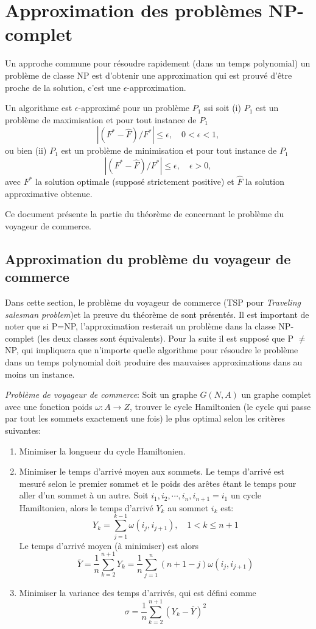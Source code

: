 \documentclass[../main.tex]{subfiles}
\begin{document}
\section{Approximation des problèmes NP-complet}
Un approche commune pour résoudre rapidement (dans un temps polynomial) un problème de classe NP est d'obtenir une approximation qui est prouvé d'être proche de la solution, c'est une $\epsilon$-approximation.

\begin{definition}
Un algorithme est $\epsilon$-approximé pour un problème $P_1$ ssi soit (i) $P_1$ est un problème de maximisation et pour tout instance de $P_1$
\[
|(F^* - \hat{F})/F^*| \leq \epsilon, \quad 0 < \epsilon < 1,
\]
ou bien (ii) $P_1$ est un problème de minimisation et pour tout instance de $P_1$
\[
|(F^* - \hat{F})/F^*| \leq \epsilon, \quad \epsilon > 0,
\]
avec $F^*$ la solution optimale (supposé strictement positive) et $\hat{F}$ la solution approximative obtenue.
\end{definition}

Ce document présente la partie du théorème de \cite{Sahni1976} concernant le problème du voyageur de commerce.

\subsection{Approximation du problème du voyageur de commerce}
Dans cette section, le problème du voyageur  de commerce (TSP pour \emph{Traveling salesman problem})et la preuve du théorème de \cite{Sahni1976} sont présentés. Il est important de noter que si P=NP, l'approximation resterait un problème dans la classe NP-complet (les deux classes sont équivalents). Pour la suite il est supposé que P $\neq$ NP, qui impliquera que n'importe quelle algorithme pour résoudre le problème dans un temps polynomial doit produire des mauvaises approximations dans au moins un instance.

\noindent \emph{Problème de voyageur de commerce}: Soit un graphe $G(N, A)$ un graphe complet avec une fonction poids $\omega : A \rightarrow Z$, trouver le cycle Hamiltonien (le cycle qui passe par tout les sommets exactement une fois) le plus optimal selon les critères suivantes:
\begin{enumerate}
\item Minimiser la longueur du cycle Hamiltonien.
\item Minimiser le temps d'arrivé moyen aux sommets. Le temps d'arrivé est mesuré selon le premier sommet et le poids des arêtes étant le temps pour aller d'un sommet à un autre. Soit $i_1, i_2, \cdots , i_n, i_{n+1}=i_1$ un cycle Hamiltonien, alors le temps d'arrivé $Y_k$ au sommet $i_k$ est:
\[
Y_k = \sum _{j = 1} ^{k-1} \omega (i_j, i_{j+1}), \quad 1 < k \leq n+1
\]
Le temps d'arrivé moyen (à minimiser) est alors
\[
\bar{Y} = \frac{1}{n} \sum _{k = 2} ^{n+1} Y_k = \frac{1}{n} \sum _{j = 1} ^{n} (n+1-j)\omega (i_j, i_{j+1})
\]
\item Minimiser la variance des temps d'arrivés, qui est défini comme
\[
\sigma = \frac{1}{n}\sum_{k = 2}^{n+1} (Y_k - \bar{Y})^2
\]
\end{enumerate}
\end{document}
